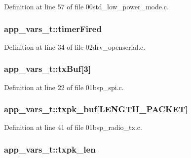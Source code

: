 Definition at line 57 of file 00std\+\_\+low\+\_\+power\+\_\+mode.\+c.

\subsubsection[{\texorpdfstring{timer\+Fired}{timerFired}}]{ app\+\_\+vars\+\_\+t\+::timer\+Fired}\hypertarget{structapp__vars__t_afbb8540fb4d8c5ba2c0ec44a7b29d6ee}{}\label{structapp__vars__t_afbb8540fb4d8c5ba2c0ec44a7b29d6ee}


Definition at line 34 of file 02drv\+\_\+openserial.\+c.

\subsubsection[{\texorpdfstring{tx\+Buf}{txBuf}}]{ app\+\_\+vars\+\_\+t\+::tx\+Buf\mbox{[}3\mbox{]}}\hypertarget{structapp__vars__t_a304a66d1c86d09156c08f957f8398538}{}\label{structapp__vars__t_a304a66d1c86d09156c08f957f8398538}


Definition at line 22 of file 01bsp\+\_\+spi.\+c.

\subsubsection[{\texorpdfstring{txpk\+\_\+buf}{txpk_buf}}]{ app\+\_\+vars\+\_\+t\+::txpk\+\_\+buf\mbox{[}{\bf L\+E\+N\+G\+T\+H\+\_\+\+P\+A\+C\+K\+ET}\mbox{]}}\hypertarget{structapp__vars__t_a7f7ce01849624476ca4caa5b9b67499f}{}\label{structapp__vars__t_a7f7ce01849624476ca4caa5b9b67499f}


Definition at line 41 of file 01bsp\+\_\+radio\+\_\+tx.\+c.

\subsubsection[{\texorpdfstring{txpk\+\_\+len}{txpk_len}}]{ app\+\_\+vars\+\_\+t\+::txpk\+\_\+len}\hypertarget{structapp__vars__t_acdc3121c80bbb6230df1a1e25bc30880}{}\label{structapp__vars__t_acdc3121c80bbb6230df1a1e25bc30880}


